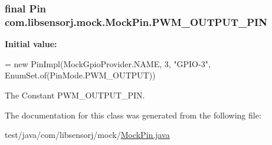 \subsubsection[{P\+W\+M\+\_\+\+O\+U\+T\+P\+U\+T\+\_\+\+P\+I\+N}]{\setlength{\rightskip}{0pt plus 5cm}final Pin com.\+libsensorj.\+mock.\+Mock\+Pin.\+P\+W\+M\+\_\+\+O\+U\+T\+P\+U\+T\+\_\+\+P\+I\+N\hspace{0.3cm}{\ttfamily [static]}}\label{classcom_1_1libsensorj_1_1mock_1_1MockPin_af15fcc7a04ad7751ca96f968d1ac1b91}
{\bfseries Initial value\+:}
\begin{DoxyCode}
= \textcolor{keyword}{new} PinImpl(MockGpioProvider.NAME, 3, \textcolor{stringliteral}{"GPIO-3"}, 
                                                         EnumSet.of(PinMode.PWM\_OUTPUT))
\end{DoxyCode}
The Constant P\+W\+M\+\_\+\+O\+U\+T\+P\+U\+T\+\_\+\+P\+I\+N. 

The documentation for this class was generated from the following file\+:\begin{DoxyCompactItemize}
\item 
test/java/com/libsensorj/mock/\hyperlink{MockPin_8java}{Mock\+Pin.\+java}\end{DoxyCompactItemize}
